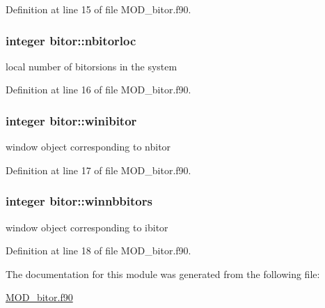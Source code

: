 Definition at line 15 of file M\-O\-D\-\_\-bitor.\-f90.

\hypertarget{classbitor_aa3ca03217a11110d43f742bc392e13cc}{
\subsubsection[{nbitorloc}]{\setlength{\rightskip}{0pt plus 5cm}integer bitor\-::nbitorloc}}\label{classbitor_aa3ca03217a11110d43f742bc392e13cc}


local number of bitorsions in the system 



Definition at line 16 of file M\-O\-D\-\_\-bitor.\-f90.

\hypertarget{classbitor_a2f70e673c8c6ef2e72dd74407de89533}{
\subsubsection[{winibitor}]{\setlength{\rightskip}{0pt plus 5cm}integer bitor\-::winibitor}}\label{classbitor_a2f70e673c8c6ef2e72dd74407de89533}


window object corresponding to nbitor 



Definition at line 17 of file M\-O\-D\-\_\-bitor.\-f90.

\hypertarget{classbitor_a76befb63ae9b30cc6cd457d599f798c0}{
\subsubsection[{winnbbitors}]{\setlength{\rightskip}{0pt plus 5cm}integer bitor\-::winnbbitors}}\label{classbitor_a76befb63ae9b30cc6cd457d599f798c0}


window object corresponding to ibitor 



Definition at line 18 of file M\-O\-D\-\_\-bitor.\-f90.



The documentation for this module was generated from the following file\-:\begin{DoxyCompactItemize}
\item 
\hyperlink{MOD__bitor_8f90}{M\-O\-D\-\_\-bitor.\-f90}\end{DoxyCompactItemize}
